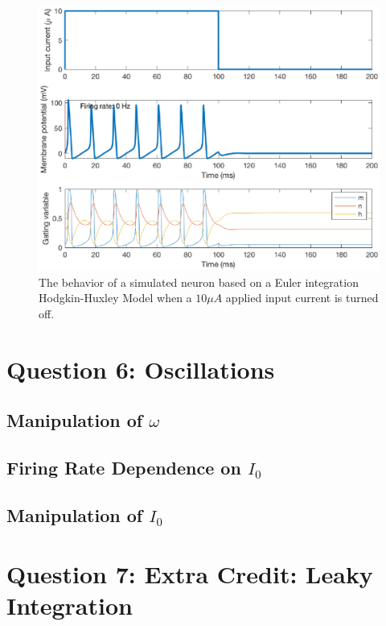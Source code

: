 \documentclass[11pt, oneside]{article}
\begin{document}
\begin{figure}[ht!]
\centering
\includegraphics[width=1\textwidth]{5d.eps}
\caption{The behavior of a simulated neuron based on a Euler integration Hodgkin-Huxley Model when a $10\mu A$ applied input current is turned off.}
\label{fig:5d}
\end{figure}

\section{Question 6: Oscillations}

\subsection{Manipulation of $\omega$}

\subsection{Firing Rate Dependence on $I_0$}

\subsection{Manipulation of $I_0$}

\section{Question 7: Extra Credit: Leaky Integration}
\end{document}
